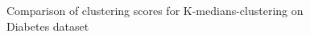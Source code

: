 \begin{figure}[H]
	\centering
	
	\caption{Comparison of clustering scores for K-medians-clustering on Diabetes dataset}%
	\label{fig:kmedians_diabetes}
\end{figure}

